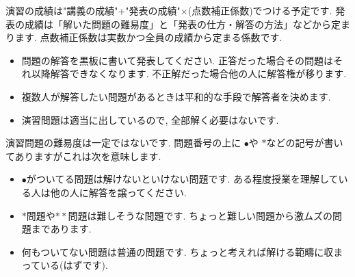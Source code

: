 \documentclass[dvipdfmx,a4paper,11pt]{article}
\theoremstyle{definition}
\begin{document}
演習の成績は"講義の成績"+"発表の成績"×(点数補正係数)でつける予定です. 発表の成績は「解いた問題の難易度」と「発表の仕方・解答の方法」などから定まります. 点数補正係数は実数かつ全員の成績から定まる係数です.

\vspace{11pt}

\hspace{-18pt}{\Large 解答の仕方について}
\begin{itemize}
  \setlength{\parskip}{0cm} %
  \setlength{\itemsep}{0cm} %
  \item 問題の解答を黒板に書いて発表してください. 正答だった場合その問題はそれ以降解答できなくなります. 不正解だった場合他の人に解答権が移ります. 
  \item 複数人が解答したい問題があるときは平和的な手段で解答者を決めます. 
  \item 演習問題は適当に出しているので, 全部解く必要はないです.
 \end{itemize}
演習問題の難易度は一定ではないです. 問題番号の上に $\bullet$や $*$などの記号が書いてありますがこれは次を意味します.
\begin{itemize}
  \setlength{\parskip}{0cm} %
  \setlength{\itemsep}{0cm} %
\item $\bullet$がついてる問題は解けないといけない問題です. ある程度授業を理解している人は他の人に解答を譲ってください.
\item $*$問題や$**$問題は難しそうな問題です. ちょっと難しい問題から激ムズの問題まであります.
\item 何もついてない問題は普通の問題です. ちょっと考えれば解ける範疇に収まっている(はずです).
\end{itemize}
\end{document}
